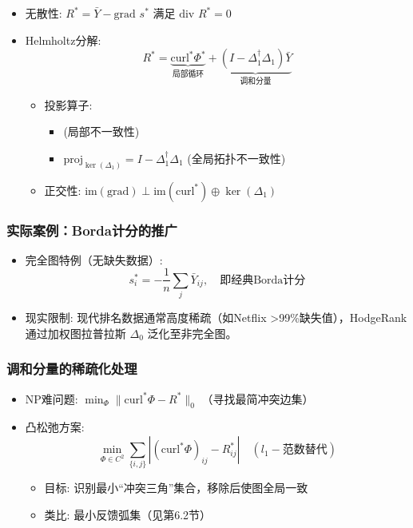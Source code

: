 \documentclass[a4paper]{article}
\begin{document}
\begin{itemize}
    \item 无散性: $R^* = \bar{Y} - \text{grad } s^*$ 满足 $\text{div } R^* = 0$
    
    \item Helmholtz分解:
    $$
    R^* = \underbrace{\text{curl}^* \Phi^*}_{\text{局部循环}} + \underbrace{(I - \Delta_1^\dagger \Delta_1) \bar{Y}}_{\text{调和分量}}
    $$
    \begin{itemize}
        \item 投影算子:
        \begin{itemize}
            \item (局部不一致性)
            \item $\text{proj}_{\ker(\Delta_1)} = I - \Delta_1^\dagger \Delta_1$ (全局拓扑不一致性)
        \end{itemize}
        
        \item 正交性: $\text{im}(\text{grad}) \perp \text{im}(\text{curl}^*) \oplus \ker(\Delta_1)$
    \end{itemize}
\end{itemize}
\subsubsection{实际案例：Borda计分的推广}

\begin{itemize}
    \item 完全图特例（无缺失数据）:
    $$
    s_i^* = -\frac{1}{n} \sum_j \bar{Y}_{ij}, \quad \text{即经典Borda计分}
    $$
    
    \item 现实限制: 现代排名数据通常高度稀疏（如Netflix >99\%缺失值），HodgeRank通过加权图拉普拉斯 $\Delta_0$ 泛化至非完全图。
\end{itemize}

\subsubsection{调和分量的稀疏化处理}

\begin{itemize}
    \item NP难问题: $\min_{\Phi} \| \text{curl}^* \Phi - R^* \|_0$ （寻找最简冲突边集）
    
    \item 凸松弛方案:
    $$
    \min_{\Phi \in C^2} \sum_{\{i,j\}} |(\text{curl}^* \Phi)_{ij} - R_{ij}^*| \quad (l_1-\text{范数替代})
    $$
    \begin{itemize}
        \item 目标: 识别最小“冲突三角”集合，移除后使图全局一致
        \item 类比: 最小反馈弧集（见第6.2节）
    \end{itemize}
\end{itemize}
\end{document}
